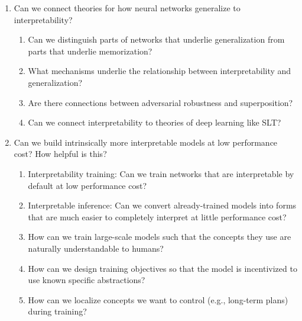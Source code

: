 \begin{enumerate}
    \item Can we connect theories for how neural networks generalize to interpretability?
    \begin{enumerate}[label=\alph*.]
        \item Can we distinguish parts of networks that underlie generalization from parts that underlie memorization?
        \item What mechanisms underlie the relationship between interpretability and generalization?
        \item Are there connections between adversarial robustness and superposition?
        \item Can we connect interpretability to theories of deep learning like SLT?
    \end{enumerate}
    
    \item Can we build intrinsically more interpretable models at low performance cost? How helpful is this?
    \begin{enumerate}[label=\alph*.]
        \item Interpretability training: Can we train networks that are interpretable by default at low performance cost?
        \item Interpretable inference: Can we convert already-trained models into forms that are much easier to completely interpret at little performance cost?
        \item How can we train large-scale models such that the concepts they use are naturally understandable to humans?
        \item How can we design training objectives so that the model is incentivized to use known specific abstractions?
        \item How can we localize concepts we want to control (e.g., long-term plans) during training?
    \end{enumerate}
\end{enumerate}

